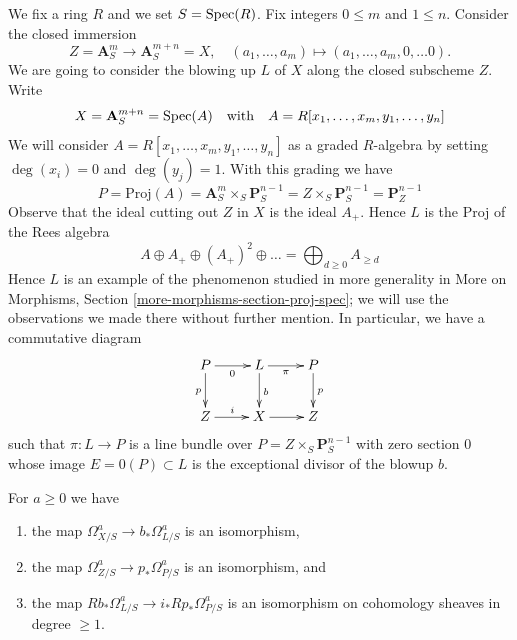 \medskip\noindent
We fix a ring $R$ and we set $S = \mathop{\mathrm{Spec}}(R)$. Fix integers $0 \leq m$ and
$1 \leq n$. Consider the closed immersion
$$
Z = \mathbf{A}^m_S \longrightarrow \mathbf{A}^{m + n}_S = X,\quad
(a_1, \ldots, a_m) \mapsto (a_1, \ldots, a_m, 0, \ldots 0).
$$
We are going to consider the blowing up $L$ of $X$
along the closed subscheme $Z$. Write
$$
X =
\mathbf{A}^{m + n}_S =
\mathop{\mathrm{Spec}}(A)
\quad\text{with}\quad
A = R[x_1, \ldots, x_m, y_1, \ldots, y_n]
$$
We will consider $A = R[x_1, \ldots, x_m, y_1, \ldots, y_n]$ as a
graded $R$-algebra by setting $\deg(x_i) = 0$ and $\deg(y_j) = 1$.
With this grading we have
$$
P =
\text{Proj}(A) =
\mathbf{A}^m_S \times_S \mathbf{P}^{n - 1}_S =
Z \times_S \mathbf{P}^{n - 1}_S =
\mathbf{P}^{n - 1}_Z
$$
Observe that the ideal cutting out $Z$ in $X$ is the ideal $A_+$.
Hence $L$ is the Proj of the Rees algebra
$$
A \oplus A_+ \oplus (A_+)^2 \oplus \ldots =
\bigoplus\nolimits_{d \geq 0} A_{\geq d}
$$
Hence $L$ is an example of the phenomenon studied in
more generality in More on Morphisms, Section
\ref{more-morphisms-section-proj-spec};
we will use the observations we made there without further mention.
In particular, we have a commutative diagram
$$
\xymatrix{
P \ar[r]_0 \ar[d]_p &
L \ar[r]_-\pi \ar[d]^b &
P \ar[d]^p \\
Z \ar[r]^i &
X \ar[r] &
Z
}
$$
such that $\pi : L \to P$ is a line bundle over
$P = Z \times_S \mathbf{P}^{n - 1}_S$
with zero section $0$ whose image $E = 0(P) \subset L$
is the exceptional divisor of the blowup $b$.

\begin{lemma}
\label{lemma-comparison}
For $a \geq 0$ we have
\begin{enumerate}
\item the map
$\Omega^a_{X/S} \to b_*\Omega^a_{L/S}$ is an isomorphism,
\item the map $\Omega^a_{Z/S} \to p_*\Omega^a_{P/S}$ is an isomorphism,
and
\item the map $Rb_*\Omega^a_{L/S} \to i_*Rp_*\Omega^a_{P/S}$ is an isomorphism
on cohomology sheaves in degree $\geq 1$.
\end{enumerate}
\end{lemma}

